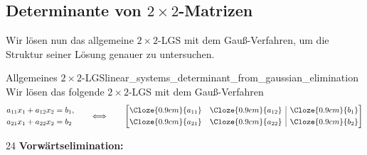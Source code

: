 \subsection{Determinante von $2\times2$-Matrizen}
\label{subsec:linear_systems_two_by_two_determinants}

Wir lösen nun das allgemeine $2\times2$-LGS mit dem Gauß-Verfahren, um die
Struktur seiner Lösung genauer zu untersuchen.

\begin{ExampleBox}{Allgemeines $2\times2$-LGS}{linear_systems_determinant_from_gaussian_elimination}
  Wir lösen das folgende $2\times2$-LGS mit dem Gauß-Verfahren
  \[
    \begin{aligned}
      a_{11}x_1+a_{12}x_2&=b_1,\\
      a_{21}x_1+a_{22}x_2&=b_2
    \end{aligned}
    \qquad\Longleftrightarrow\qquad
    \left[
      \begin{array}{@{}cc|c@{}}
        \Cloze{0.9cm}{a_{11}}&\Cloze{0.9cm}{a_{12}}&\Cloze{0.9cm}{b_1}\\[0.3em]
        \Cloze{0.9cm}{a_{21}}&\Cloze{0.9cm}{a_{22}}&\Cloze{0.9cm}{b_2}
      \end{array}
    \right]
  \]

  \begin{ClozeArea}[34]{24}
    \textbf{Vorwärtselimination:}
    \begin{center}
    \end{center}
  \end{ClozeArea}
\end{ExampleBox}

